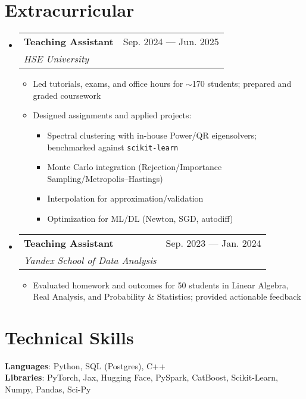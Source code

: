 \documentclass[letterpaper,11pt]{article}
\makeatletter
\newcommand{\resumeItem}[1]{
  \item\small{
    {#1 \vspace{-2pt}}
  }
}
\newcommand{\resumeSubheading}[4]{
  \vspace{-2pt}\item
    \begin{tabular*}{0.97\textwidth}[t]{l@{\extracolsep{\fill}}r}
      \textbf{#1} & #2 \\
      \textit{\small#3} & \textit{\small #4} \\
    \end{tabular*}\vspace{-7pt}
}
\newcommand{\resumeSubHeadingListStart}{\begin{itemize}[leftmargin=0.15in, label={}]}
\newcommand{\resumeSubHeadingListEnd}{\end{itemize}}
\newcommand{\resumeItemListStart}{\begin{itemize}}
\newcommand{\resumeItemListEnd}{\end{itemize}\vspace{-5pt}}
\makeatother
\begin{document}
\section{Extracurricular}
\resumeSubHeadingListStart
  \resumeSubheading{Teaching Assistant}{Sep. 2024 --- Jun. 2025}{HSE University}{}
    \resumeItemListStart
      \resumeItem{Led tutorials, exams, and office hours for $\sim$170 students; prepared and graded coursework}
      \resumeItem{Designed assignments and applied projects:%
        \vspace{-2pt}
        \begin{itemize}[noitemsep, topsep=0pt, leftmargin=1.2em, label=\textendash]
          \item Spectral clustering with in-house Power/QR eigensolvers; benchmarked against \texttt{scikit-learn}
          \item Monte Carlo integration (Rejection/Importance Sampling/Metropolis--Hastings)
          \item Interpolation for approximation/validation
          \item Optimization for ML/DL (Newton, SGD, autodiff)
        \end{itemize}
      }
    \resumeItemListEnd

  \resumeSubheading{Teaching Assistant}{Sep. 2023 --- Jan. 2024}{Yandex School of Data Analysis}{}
    \resumeItemListStart
      \resumeItem{Evaluated homework and outcomes for 50 students in Linear Algebra, Real Analysis, and Probability \& Statistics; provided actionable feedback}
    \resumeItemListEnd
\resumeSubHeadingListEnd

\section{Technical Skills}
 \begin{itemize}[leftmargin=0.15in, label={}]
    \small{\item{
     \textbf{Languages}{: Python, SQL (Postgres), C++} \\
     \textbf{Libraries}{: PyTorch, Jax, Hugging Face, PySpark, CatBoost, Scikit-Learn, Numpy, Pandas, Sci-Py} \\
    }}
 \end{itemize}


\end{document}
